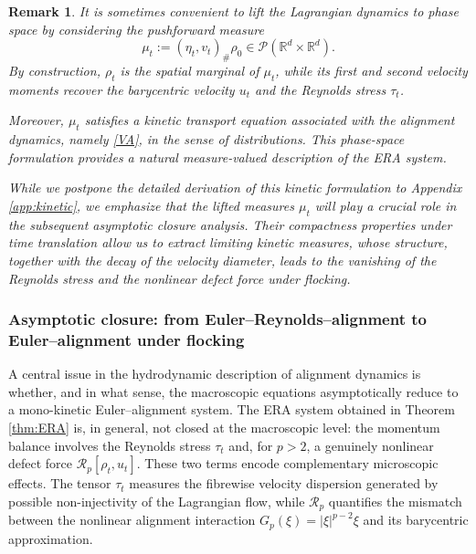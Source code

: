 \documentclass[10pt,reqno]{amsart}
\numberwithin{equation}{section}
\newtheorem{remark}{Remark}[section]
\newcommand{\R}{\mathbb R}
\newcommand{\calP}{\mathcal P}
\newcommand{\calR}{\mathcal R}
\begin{document}
\begin{remark} 
It is sometimes convenient to lift the Lagrangian dynamics to phase space by considering the pushforward measure
\[
\mu_t := (\eta_t,v_t)_\#\rho_0 \in \calP(\R^d\times\R^d).
\]
By construction, $\rho_t$ is the spatial marginal of $\mu_t$, while its first and second velocity moments recover the barycentric velocity $u_t$ and the Reynolds stress $\tau_t$.

Moreover, $\mu_t$ satisfies a kinetic transport equation associated with the alignment dynamics, namely \eqref{VA}, in the sense of distributions. This phase-space formulation provides a natural measure-valued description of the ERA system.

While we postpone the detailed derivation of this kinetic formulation to Appendix \ref{app:kinetic}, we emphasize that the lifted measures $\mu_t$ will play a crucial role in the subsequent asymptotic closure analysis. Their compactness properties under time translation allow us to extract limiting kinetic measures, whose structure, together with the decay of the velocity diameter, leads to the vanishing of the Reynolds stress and the nonlinear defect force under flocking.
\end{remark}



                      




\subsubsection{Asymptotic closure: from Euler--Reynolds--alignment to Euler--alignment under flocking}
A central issue in the hydrodynamic description of alignment dynamics is whether, and in what sense, the macroscopic equations asymptotically reduce to a mono-kinetic Euler--alignment system.
 The ERA system obtained in Theorem \ref{thm:ERA} is, in general, not closed at the macroscopic level: the momentum balance involves the Reynolds stress $\tau_t$ and, for $p>2$, a genuinely nonlinear defect force $\calR_p[\rho_t,u_t]$. These two terms encode complementary microscopic effects. The tensor $\tau_t$ measures the fibrewise velocity dispersion generated by possible non-injectivity of the Lagrangian flow, while $\calR_p$ quantifies the mismatch between the nonlinear alignment interaction $G_p(\xi)=|\xi|^{p-2}\xi$ and its barycentric approximation.
\end{document}
